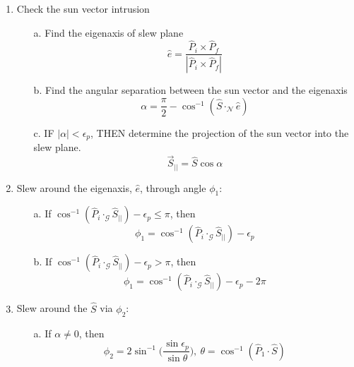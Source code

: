 \documentclass{article}
\begin{document}
	
	
	
	\begin{enumerate}
		
		\item Check the sun vector intrusion 
		
		\begin{enumerate}
			\item[a.] Find the eigenaxis of slew plane 
				\begin{equation}\label{eaxis}
				\hat{e}=\frac{\hat{P}_i\times\hat{P}_f}{|\hat{P}_i\times \hat{P}_f|}
				\end{equation} 
			\item[b.] Find the angular separation between the sun vector and the eigenaxis 
				\begin{equation}
				\alpha=\frac{\pi}{2}-\cos^{-1}(\hat{S}\cdot_\mathcal{N}\hat{e})
				\end{equation}
			\item[c.] IF $|\alpha|<\epsilon_p$, THEN determine the projection of the sun vector into the slew plane.
				\begin{equation}\label{Sbar}
				\vec{S}_{||}=\hat{S}\cos\alpha
				\end{equation}
		\end{enumerate}
		
		\item Slew around the eigenaxis, $\hat{e}$, through angle $\phi_1$:
		
			\begin{enumerate}
				\item[a.] If $\cos^{-1}(\hat{P}_i\cdot_\mathcal{G}\hat{S}_{||})-\epsilon_p\leq \pi$, then 
					\begin{equation}
					\phi_1 = \cos^{-1}(\hat{P}_i\cdot_\mathcal{G}\hat{S}_{||})-\epsilon_p
					\end{equation}
				\item[b.] If $\cos^{-1}(\hat{P}_i\cdot_\mathcal{G}\hat{S}_{||})-\epsilon_p>\pi$, then 
					\begin{equation}
					\phi_1 = \cos^{-1}(\hat{P}_i\cdot_\mathcal{G}\hat{S}_{||})-\epsilon_p-2\pi
					\end{equation}
			\end{enumerate}
			
		\item Slew around the $\hat{S}$ via $\phi_2$:
		
			\begin{enumerate}
				\item[a.] If $\alpha \neq 0$, then 
					\begin{equation}
					\phi_2 = 2\sin^{-1}\Big( \frac{ \sin\epsilon_p}{\sin \theta}\Big),\ \theta=\cos^{-1}(\hat{P}_1\cdot\hat{S})
					\end{equation}
				

\end{enumerate}
\end{enumerate}
\end{document}
